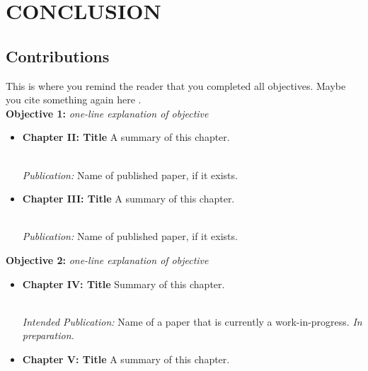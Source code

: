 
\chapter{CONCLUSION}\label{Discussion}
\renewcommand{\thechapter}{\arabic{chapter}}
\section{Contributions}
This is where you remind the reader that you completed all objectives. Maybe you cite something again here \cite{book1}. \\ 

\noindent
\textbf{Objective 1:} \textit{one-line explanation of objective} 

\begin{itemize}
\item{\textbf{Chapter II: Title} A summary of this chapter.
\\ \\
\begin{footnotesize}
\textit{Publication:}
Name of published paper, if it exists. \end{footnotesize}}

\item{\textbf{Chapter III: Title} A summary of this chapter.
\\ \\
\begin{footnotesize}
\textit{Publication:}
Name of published paper, if it exists. \end{footnotesize}}
\end{itemize}

\noindent
\textbf{Objective 2:} \textit{one-line explanation of objective}   

\begin{itemize}
\item{\textbf{Chapter IV: Title} Summary of this chapter. \\
\\ 
\begin{footnotesize}
\textit{Intended Publication:}
Name of a paper that is currently a work-in-progress. \textit{In preparation.} \end{footnotesize}}

\item{\textbf{Chapter V: Title} A summary of this chapter.}

\end{itemize}
\noindent


